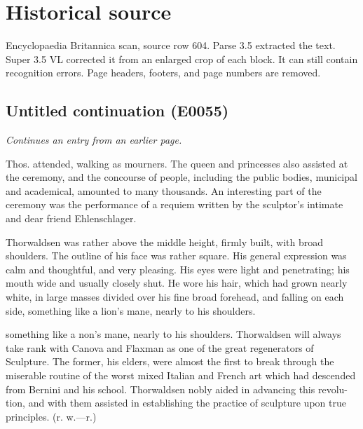 \documentclass{article}
\begin{document}
\section*{Historical source}
Encyclopaedia Britannica scan, source row 604. Parse 3.5 extracted the text. Super 3.5 VL corrected it from an enlarged crop of each block. It can still contain recognition errors.
Page headers, footers, and page numbers are removed.

\subsection*{Untitled continuation (E0055)}
\textit{Continues an entry from an earlier page.}

Thos. attended, walking as mourners. The queen and princesses also assisted at the ceremony, and the concourse of people, including the public bodies, municipal and academical, amounted to many thousands. An interesting part of the ceremony was the performance of a requiem written by the sculptor's intimate and dear friend Ehlenschlager.

Thorwaldsen was rather above the middle height, firmly built, with broad shoulders. The outline of his face was rather square. His general expression was calm and thoughtful, and very pleasing. His eyes were light and penetrating; his mouth wide and usually closely shut. He wore his hair, which had grown nearly white, in large masses divided over his fine broad forehead, and falling on each side, something like a lion's mane, nearly to his shoulders.

something like a non's mane, nearly to his shoulders.
Thorwaldsen will always take rank with Canova and
Flaxman as one of the great regenerators of Sculpture.
The former, his elders, were almost the first to break
through the miserable routine of the worst mixed Italian
and French art which had descended from Bernini and his
school. Thorwaldsen nobly aided in advancing this revolu-
tion, and with them assisted in establishing the practice of
sculpture upon true principles. (r. w.—r.)
\end{document}
